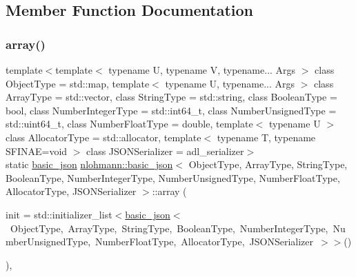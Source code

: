 \subsection{Member Function Documentation}
\mbox{\label{classnlohmann_1_1basic__json_a4a4ec75e4d2845d9bcf7a9e5458e4949}} 
\subsubsection{\texorpdfstring{array()}{array()}}
{\footnotesize\ttfamily template$<$template$<$ typename U, typename V, typename... Args $>$ class Object\+Type = std\+::map, template$<$ typename U, typename... Args $>$ class Array\+Type = std\+::vector, class String\+Type  = std\+::string, class Boolean\+Type  = bool, class Number\+Integer\+Type  = std\+::int64\+\_\+t, class Number\+Unsigned\+Type  = std\+::uint64\+\_\+t, class Number\+Float\+Type  = double, template$<$ typename U $>$ class Allocator\+Type = std\+::allocator, template$<$ typename T, typename S\+F\+I\+N\+A\+E=void $>$ class J\+S\+O\+N\+Serializer = adl\+\_\+serializer$>$ \\
static \mbox{\hyperlink{classnlohmann_1_1basic__json}{basic\+\_\+json}} \mbox{\hyperlink{classnlohmann_1_1basic__json}{nlohmann\+::basic\+\_\+json}}$<$ Object\+Type, Array\+Type, String\+Type, Boolean\+Type, Number\+Integer\+Type, Number\+Unsigned\+Type, Number\+Float\+Type, Allocator\+Type, J\+S\+O\+N\+Serializer $>$\+::array (\begin{DoxyParamCaption}\item[{std\+::initializer\+\_\+list$<$ \mbox{\hyperlink{classnlohmann_1_1basic__json}{basic\+\_\+json}}$<$ Object\+Type, Array\+Type, String\+Type, Boolean\+Type, Number\+Integer\+Type, Number\+Unsigned\+Type, Number\+Float\+Type, Allocator\+Type, J\+S\+O\+N\+Serializer $>$ $>$}]{init = {\ttfamily std\+:\+:initializer\+\_\+list$<$\mbox{\hyperlink{classnlohmann_1_1basic__json}{basic\+\_\+json}}$<$~ObjectType,~ArrayType,~StringType,~BooleanType,~NumberIntegerType,~NumberUnsignedType,~NumberFloatType,~AllocatorType,~JSONSerializer~$>$$>$()} }\end{DoxyParamCaption})\hspace{0.3cm}{\ttfamily [inline]}, {\ttfamily [static]}}



